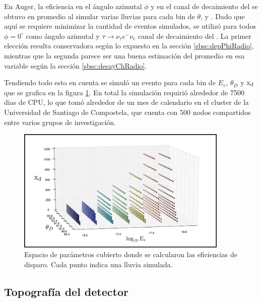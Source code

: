 	En Auger, la eficiencia en el \'angulo azimutal $\phi$ y en el canal de decaimiento del \tauon{} se obtuvo en promedio al simular varias lluvias para cada bin de $\theta$, \xd{} y \etau{}.
	Dado que aqu\'i se requiere minimizar la cantidad de eventos simulados, se utiliz\'o para todos $\phi=0^\circ$ como \'angulo azimutal y $\tau\rightarrow\nu_\tau e^-\nu_e$ canal de decaimiento del \tauon{}.
	La primer elecci\'on resulta conservadora seg\'un lo expuesto en la secci\'on \ref{sbsc:depPhiRadio}, mientras que la segunda parece ser una buena estimaci\'on del promedio en esa variable seg\'un la secci\'on \ref{sbsc:decayChRadio}.
	
	Tendiendo todo esto en cuenta se simul\'o un evento para cada bin de $E_v$, $\theta_D$ y ${\rm x_d}$ que se grafica en la figura \ref{fig:binesRadio}.
	En total la simulaci\'on requiri\'o alrededor de 7500 dias de CPU, lo que tom\'o alrededor de un mes de calendario en el cluster de la Universidad de Santiago de Compostela, que cuenta con 500 nodos compartidos entre varios grupos de investigaci\'on. 
	\begin{figure}[h!]
		\begin{center}
			\includegraphics[width=0.9\textwidth]{fig/resultadosRadio/binesRadio_3}
			\caption{\label{fig:binesRadio} Espacio de par\'ametros cubierto donde se calcularon las eficiencias de disparo. Cada punto indica una lluvia simulada.
			}
		\end{center}
	\end{figure}
	
	\subsection{Topograf\'ia del detector}
	
